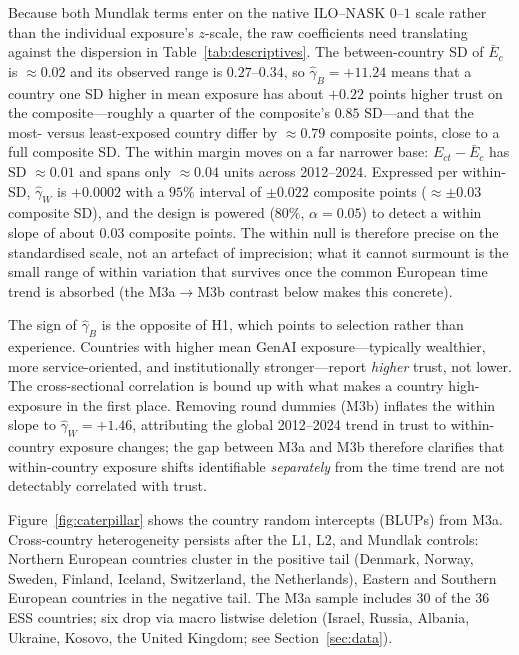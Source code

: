 Because both Mundlak terms enter on the native ILO--NASK $0$--$1$ scale
rather than the individual exposure's $z$-scale, the raw coefficients
need translating against the dispersion in Table~\ref{tab:descriptives}.
The between-country SD of $\bar E_c$ is $\approx 0.02$ and its observed
range is $0.27$--$0.34$, so $\hat\gamma_B=+11.24$ means that a country
one SD higher in mean exposure has about $+0.22$ points higher trust on
the composite---roughly a quarter of the composite's $0.85$ SD---and
that the most- versus least-exposed country differ by $\approx 0.79$
composite points, close to a full composite SD. The within margin moves
on a far narrower base: $E_{ct}-\bar E_c$ has SD $\approx 0.01$ and spans
only $\approx 0.04$ units across 2012--2024. Expressed per within-SD,
$\hat\gamma_W$ is $+0.0002$ with a $95\%$ interval of $\pm 0.022$
composite points ($\approx\pm 0.03$ composite SD), and the design is
powered ($80\%$, $\alpha=0.05$) to detect a within slope of about
$0.03$ composite points. The within null is therefore precise on the
standardised scale, not an artefact of imprecision; what it cannot
surmount is the small range of within variation that survives once the
common European time trend is absorbed (the M3a$\to$M3b contrast below
makes this concrete).

The sign of $\hat\gamma_B$ is the opposite of H1, which points to
selection rather than experience. Countries with higher mean GenAI
exposure---typically wealthier, more service-oriented, and
institutionally stronger---report \emph{higher} trust, not lower. The
cross-sectional correlation is bound up with what makes a country
high-exposure in the first place. Removing round dummies (M3b) inflates
the within slope to $\hat\gamma_W = +1.46$, attributing the global
2012--2024 trend in trust to within-country exposure changes; the gap
between M3a and M3b therefore clarifies that within-country exposure
shifts identifiable \emph{separately} from the time trend are not
detectably correlated with trust.

Figure~\ref{fig:caterpillar} shows the country random intercepts
(BLUPs) from M3a. Cross-country heterogeneity persists after the L1,
L2, and Mundlak controls: Northern European countries cluster in the
positive tail (Denmark, Norway, Sweden, Finland, Iceland, Switzerland,
the Netherlands), Eastern and Southern European countries in the
negative tail. The M3a sample includes 30 of the 36 ESS countries; six
drop via macro listwise deletion (Israel, Russia, Albania, Ukraine,
Kosovo, the United Kingdom; see Section~\ref{sec:data}).

